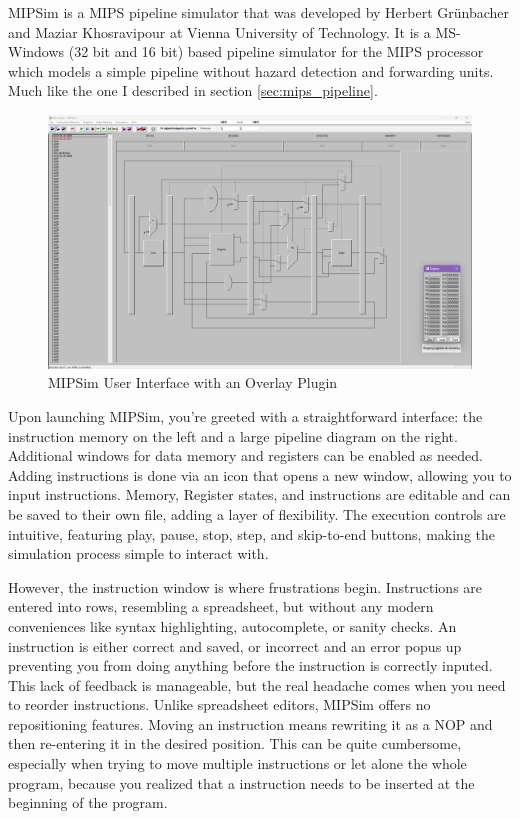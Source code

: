 MIPSim is a MIPS pipeline simulator that was developed by Herbert Grünbacher and Maziar Khosravipour at Vienna University of Technology. It is a MS-Windows (32 bit and 16 bit) based pipeline simulator for the MIPS processor which models a simple pipeline without hazard detection and forwarding units\cite{grunbacher1996windlx}. Much like the one I described in section \ref{sec:mips_pipeline}.
\begin{figure}[H]
    \centering
    \includegraphics[width=1\textwidth]{assets/images/mipsim.png}
    \caption{MIPSim User Interface with an Overlay Plugin}
    \label{fig:mipsim}
\end{figure}
Upon launching MIPSim, you're greeted with a straightforward interface: the instruction memory on the left and a large pipeline diagram on the right. Additional windows for data memory and registers can be enabled as needed. Adding instructions is done via an icon that opens a new window, allowing you to input instructions. Memory, Register states, and instructions are editable and can be saved to their own file, adding a layer of flexibility. The execution controls are intuitive, featuring play, pause, stop, step, and skip-to-end buttons, making the simulation process simple to interact with.

However, the instruction window is where frustrations begin. Instructions are entered into rows, resembling a spreadsheet, but without any modern conveniences like syntax highlighting, autocomplete, or sanity checks. An instruction is either correct and saved, or incorrect and an error popus up preventing you from doing anything before the instruction is correctly inputed. This lack of feedback is manageable, but the real headache comes when you need to reorder instructions. Unlike spreadsheet editors, MIPSim offers no repositioning features. Moving an instruction means rewriting it as a NOP and then re-entering it in the desired position. This can be quite cumbersome, especially when trying to move multiple instructions or let alone the whole program, because you realized that a instruction needs to be inserted at the beginning of the program.

